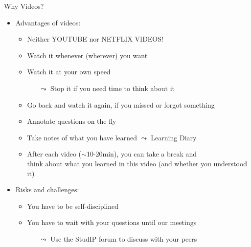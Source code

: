 \documentclass[aspectratio=169, handout]{../latex_main/tntbeamer}  %
\begin{document}
\begin{frame}[c]{Why Videos?}

\begin{itemize}
  \item Advantages of videos:
  \begin{itemize}
      \item Neither YOUTUBE nor NETFLIX VIDEOS!
      \item Watch it whenever (wherever) you want
      \item Watch it at your own speed
      \begin{itemize}
          \item[$\leadsto$] Stop it if you need time to think about it
      \end{itemize}
      \item Go back and watch it again, if you missed or forgot something
      \item Annotate questions on the fly %
      \item Take notes of what you have learned $\leadsto$ Learning Diary
      \item After each video ($\sim$10-20min), you can take a break and\\ think about what you learned in this video (and whether you understood it)
  \end{itemize}
  \medskip
  \pause
  \item Risks and challenges:
  \begin{itemize}
      \item You have to be self-disciplined 
      \item You have to wait with your questions until our meetings
      \begin{itemize}
          \item[$\leadsto$] Use the StudIP forum to discuss with your peers
      \end{itemize}
  \end{itemize}
\end{itemize}

\end{frame}
\end{document}
